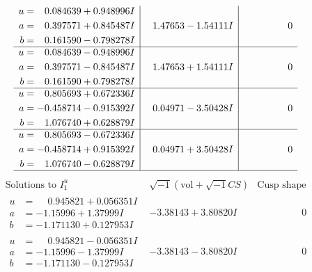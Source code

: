 \documentclass[1p]{elsarticle_modified}
\theoremstyle{definition}
\newcommand{\I}{\sqrt{-1}}
\begin{document}
$$\begin{array}{c|c|c}
\begin{aligned}
u &= \phantom{-}0.084639 + 0.948996 I \\
a &= \phantom{-}0.397571 + 0.845487 I \\
b &= \phantom{-}0.161590 - 0.798278 I\end{aligned}
 & \phantom{-}1.47653 - 1.54111 I & \phantom{-0.000000 } 0 \\ \hline\begin{aligned}
u &= \phantom{-}0.084639 - 0.948996 I \\
a &= \phantom{-}0.397571 - 0.845487 I \\
b &= \phantom{-}0.161590 + 0.798278 I\end{aligned}
 & \phantom{-}1.47653 + 1.54111 I & \phantom{-0.000000 } 0 \\ \hline\begin{aligned}
u &= \phantom{-}0.805693 + 0.672336 I \\
a &= -0.458714 - 0.915392 I \\
b &= \phantom{-}1.076740 + 0.628879 I\end{aligned}
 & \phantom{-}0.04971 - 3.50428 I & \phantom{-0.000000 } 0 \\ \hline\begin{aligned}
u &= \phantom{-}0.805693 - 0.672336 I \\
a &= -0.458714 + 0.915392 I \\
b &= \phantom{-}1.076740 - 0.628879 I\end{aligned}
 & \phantom{-}0.04971 + 3.50428 I & \phantom{-0.000000 } 0\\
 \hline 
 \end{array}$$\newpage$$\begin{array}{c|c|c}  
\text{Solutions to }I^u_{1}& \I (\text{vol} + \sqrt{-1}CS) & \text{Cusp shape}\\
 \hline 
\begin{aligned}
u &= \phantom{-}0.945821 + 0.056351 I \\
a &= -1.15996 + 1.37999 I \\
b &= -1.171130 + 0.127953 I\end{aligned}
 & -3.38143 + 3.80820 I & \phantom{-0.000000 } 0 \\ \hline\begin{aligned}
u &= \phantom{-}0.945821 - 0.056351 I \\
a &= -1.15996 - 1.37999 I \\
b &= -1.171130 - 0.127953 I\end{aligned}
 & -3.38143 - 3.80820 I & \phantom{-0.000000 } 0 \\ \hline\begin{aligned}

\end{aligned}
\end{array}$$
\end{document}
